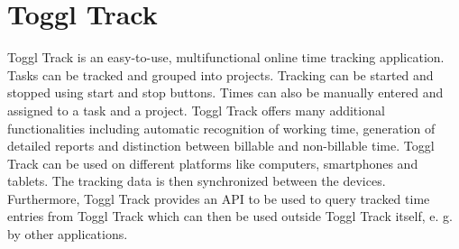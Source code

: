 
\section{Toggl Track}
Toggl Track is an easy-to-use, multifunctional online time tracking application. Tasks can be tracked and grouped
into projects. Tracking can be started and stopped using start and stop buttons. Times can also be manually entered
and assigned to a task and a project. Toggl Track offers many additional functionalities including automatic recognition 
of working time, generation of detailed reports and distinction between billable and non-billable time. Toggl Track can 
be used on different platforms like computers, smartphones and tablets. The tracking data is then synchronized between the 
devices. Furthermore, Toggl Track provides an API to be used to query tracked time entries from Toggl Track which can then
be used outside Toggl Track itself, e. g. by other applications. \cite{bachelorarbeit_Egger_Verstappen_page8}